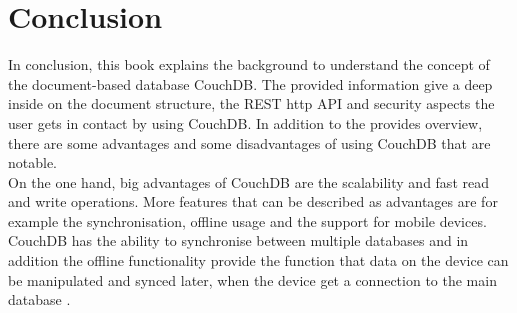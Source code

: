 \section{Conclusion}
In conclusion, this book explains the background to understand the concept of the document-based database CouchDB. The provided information give a deep inside on the document structure, the REST http API and security aspects the user gets in contact by using CouchDB.
In addition to the provides overview, there are some advantages and some disadvantages of using CouchDB that are notable.\\
\newline
On the one hand, big advantages of CouchDB are the scalability and fast read and write operations. 
More features that can be described as advantages are for example the synchronisation, offline usage and the support for mobile devices. CouchDB has the ability to synchronise between multiple databases and in addition the offline functionality provide the function that data on the device can be manipulated and synced later, when the device get a connection to the main database \cite{MoronyJosh}. 

